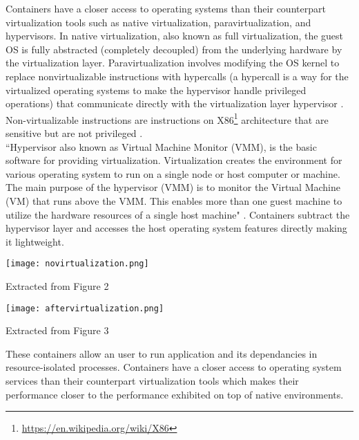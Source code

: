 Containers have a closer access to operating systems than their counterpart virtualization tools such as native virtualization, paravirtualization, and hypervisors. In native virtualization, also known as full virtualization, the guest OS is fully abstracted (completely decoupled) from the underlying hardware by the virtualization layer. Paravirtualization involves modifying the OS kernel to replace nonvirtualizable instructions with hypercalls (a hypercall is a way for the virtualized operating systems to make the hypervisor handle privileged operations) that communicate directly with the virtualization layer hypervisor \cite{citeulike:11530382}. Non-virtualizable instructions are instructions on X86\footnote{\url{https://en.wikipedia.org/wiki/X86}} architecture that are sensitive but are not privileged \cite{non-virtualizable-commands}.\\ 

``Hypervisor also known as Virtual Machine Monitor (VMM), is the basic software for providing virtualization. Virtualization creates the environment for various operating system to run on a single node or host computer or machine. The main purpose of the hypervisor (VMM) is to monitor the Virtual Machine (VM) that runs above the VMM. This enables more than one guest machine to utilize the hardware resources of a single host machine" \cite{hypervisor}. Containers subtract the hypervisor layer and accesses the host operating system features directly making it lightweight.\\

\begin{center}
\begin{minipage}{0.48\linewidth}
\texttt{[image: novirtualization.png]}
\label{fig:novirtualization}
\caption*{Extracted from \cite{10.4236/ijcns.2015.87026} Figure 2}
\end{minipage}%
\hfill
\begin{minipage}{0.48\linewidth}
\texttt{[image: aftervirtualization.png]}
\label{fig:aftervirtualization}
\caption*{Extracted from \cite{10.4236/ijcns.2015.87026} Figure 3}
\end{minipage}
\end{center}

These containers allow an user to run application and its dependancies in resource-isolated processes. Containers have a closer access to operating system services than their counterpart virtualization tools which makes their performance closer to the performance exhibited on top of native environments\cite{Xavier:2013:PEC:2497369.2497577}.\\

